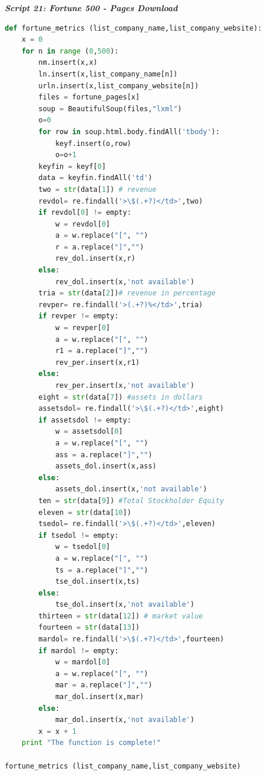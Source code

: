 \documentclass{article}
\begin{document}
\begin{center}
\textit{\textbf{Script 21: Fortune 500 - Pages Download}}\label{p21}
\end{center}
\begin{lstlisting}[language=Python]  
def fortune_metrics (list_company_name,list_company_website):
    x = 0
    for n in range (0,500):  
        nm.insert(x,x)
        ln.insert(x,list_company_name[n])
        urln.insert(x,list_company_website[n])
        files = fortune_pages[x]
        soup = BeautifulSoup(files,"lxml")
        o=0
        for row in soup.html.body.findAll('tbody'):
            keyf.insert(o,row)
            o=o+1
        keyfin = keyf[0] 
        data = keyfin.findAll('td')
        two = str(data[1]) # revenue 
        revdol= re.findall('>\$(.+?)</td>',two) 
        if revdol[0] != empty:
            w = revdol[0]
            a = w.replace("[", "")
            r = a.replace("]","")
            rev_dol.insert(x,r)
        else:
            rev_dol.insert(x,'not available')
        tria = str(data[2])# revenue in percentage
        revper= re.findall('>(.+?)%</td>',tria) 
        if revper != empty:    
            w = revper[0]
            a = w.replace("[", "")
            r1 = a.replace("]","")    
            rev_per.insert(x,r1) 
        else:
            rev_per.insert(x,'not available')
        eight = str(data[7]) #assets in dollars 
        assetsdol= re.findall('>\$(.+?)</td>',eight) 
        if assetsdol != empty:
            w = assetsdol[0]
            a = w.replace("[", "")
            ass = a.replace("]","")
            assets_dol.insert(x,ass)
        else:
            assets_dol.insert(x,'not available')
        ten = str(data[9]) #Total Stockholder Equity   
        eleven = str(data[10]) 
        tsedol= re.findall('>\$(.+?)</td>',eleven) 
        if tsedol != empty:
            w = tsedol[0]
            a = w.replace("[", "")
            ts = a.replace("]","")
            tse_dol.insert(x,ts)
        else:
            tse_dol.insert(x,'not available')
        thirteen = str(data[12]) # market value
        fourteen = str(data[13]) 
        mardol= re.findall('>\$(.+?)</td>',fourteen) 
        if mardol != empty:
            w = mardol[0]
            a = w.replace("[", "")
            mar = a.replace("]","")
            mar_dol.insert(x,mar)
        else:
            mar_dol.insert(x,'not available')
        x = x + 1
    print "The function is complete!"

fortune_metrics (list_company_name,list_company_website)
\end{lstlisting}
\end{document}

